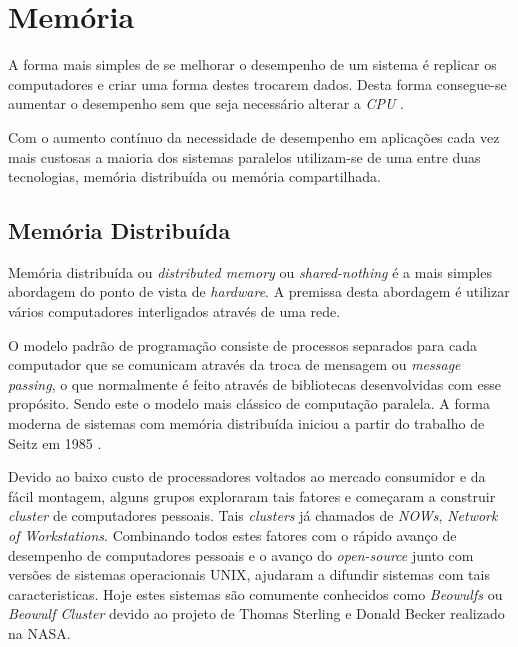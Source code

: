 \section{Memória}

A forma mais simples de se melhorar o desempenho de um sistema é
replicar os computadores e criar uma forma destes trocarem dados.
Desta forma consegue-se aumentar o desempenho sem que seja necessário alterar a
\textit{CPU} \cite[2.2]{sopc}.

Com o aumento contínuo da necessidade de desempenho em aplicações cada vez mais
custosas a maioria dos sistemas paralelos utilizam-se de uma entre duas
tecnologias, memória distribuída ou memória compartilhada.


\subsection{Memória Distribuída}

Memória distribuída ou \textit{distributed memory} ou \textit{shared-nothing} é
a mais simples abordagem do ponto de vista de \textit{hardware}. 
A premissa desta abordagem é utilizar vários computadores interligados através 
de uma rede.

O modelo padrão de programação consiste de processos separados para cada
computador que se comunicam através da troca de mensagem ou 
\textit{message passing}, o que normalmente é feito através de bibliotecas
desenvolvidas com esse propósito. 
Sendo este o modelo mais clássico de computação paralela. 
A forma moderna de sistemas com memória distribuída iniciou a partir do trabalho 
de Seitz em 1985 \cite{Seitz:1985}.

Devido ao baixo custo de processadores voltados ao mercado consumidor e da fácil
montagem, alguns grupos exploraram tais fatores e começaram a construir
\textit{cluster} de computadores pessoais. 
Tais \textit{clusters} já chamados de \textit{NOWs}, 
\textit{Network of Workstations}.
Combinando todos estes fatores com o rápido avanço de desempenho de computadores
pessoais e o avanço do \textit{open-source} junto com  versões de sistemas 
operacionais UNIX, ajudaram a difundir sistemas com tais caracteristicas. 
Hoje estes sistemas são comumente conhecidos como \textit{Beowulfs} ou
\textit{Beowulf Cluster} devido ao projeto de Thomas Sterling e Donald Becker
realizado na NASA.


